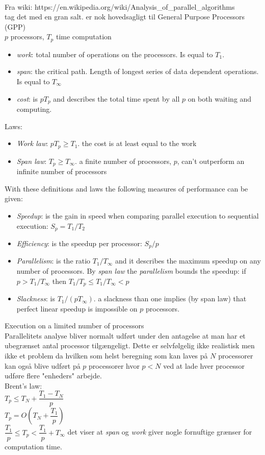 ~\\
Fra wiki: https://en.wikipedia.org/wiki/Analysis\_of\_parallel\_algorithms\\
tag det med en gran salt. er nok hovedsagligt til General Purpose Processors (GPP)\\
$p$ processors, $T_p$ time computation
\begin{itemize}
 \item \textit{work}: total number of operations on the processors. Is equal to $T_1$.
 \item \textit{span}: the critical path. Length of longest series of data dependent operations. Is equal to $T_\infty$
 \item \textit{cost}: is $pT_p$ and describes the total time spent by all $p$ on both waiting and computing.
\end{itemize}
Laws:
\begin{itemize}
  \item \textit{Work law}: $pT_p \geq T_1$. the cost is at least equal to the work
  \item \textit{Span law}: $T_p \geq T_\infty$. a finite number of processors, $p$, can't outperform an infinite number of processors
\end{itemize}
With these definitions and laws the following measures of performance can be given:
\begin{itemize}
  \item \textit{Speedup}: is the gain in speed when comparing parallel execution to sequential execution: $S_p = T_1 / T_2$
  \item \textit{Efficiency}: is the speedup per processor: $S_p / p$
  \item \textit{Parallelism}: is the ratio $T_1 / T_\infty$ and it describes the maximum speedup on any number of processors. By \textit{span law} the \textit{parallelism} bounds the speedup: if $p>T_1/ T_\infty$ then $T_1/T_p \leq T_1 / T_\infty < p$ 
  \item \textit{Slackness}: is $T_1/(pT_\infty)$. a slackness than one implies (by span law) that perfect linear speedup is impossible on $p$ processors.
\end{itemize}
Execution on a limited number of processors\\
Parallelitets analyse bliver normalt udført under den antagelse at man har et ubegrænset antal processor tilgængeligt. Dette er selvfølgelig ikke realistisk men ikke et problem da hvilken som helst beregning som kan laves på $N$ processorer kan også blive udført på $p$ processorer hvor $p < N$ ved at lade hver processor udføre flere "enheders" arbejde. \\
Brent's law:\\
$T_p \leq T_N + \dfrac{T_1 - T_N}{p}$ \\
$T_p = O \left( T_N + \dfrac{T_1}{p} \right)$\\
$\dfrac{T_1}{p} \leq T_p < \dfrac{T_1}{p} + T_\infty$ det viser at \textit{span} og \textit{work} giver nogle fornuftige grænser for computation time.\\

